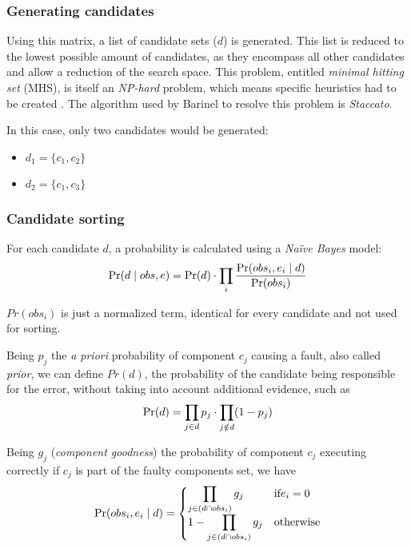 % 
%

\subsubsection{Generating candidates} 

Using this matrix, a list of candidate sets ($d$) is generated. This list is reduced to the lowest possible amount of candidates, as they encompass all other candidates and allow a reduction of the search space. This problem, entitled \emph{minimal hitting set} (MHS), is itself an \emph{NP-hard} problem, which means specific heuristics had to be created \cite{RuiAbreu, Cardoso2013}. The algorithm used by Barinel to resolve this problem is \emph{Staccato}.

In this case, only two candidates would be generated:

\begin{itemize}
\item $d_1 = \{c_1, c_2\}$ 
\item $d_2 = \{c_1, c_3\}$ 
\end{itemize}

% 
%

\subsubsection{Candidate sorting} 

For each candidate $d$, a probability is calculated using a \emph{Naïve Bayes} model:
%
\begin{equation}
  \mbox{Pr}(d\mid obs,e) =  \mbox{Pr}(d) \cdot \prod_{i}\frac{\mbox{Pr}(obs_i, e_i \mid d)}{\mbox{Pr}(obs_i)}
\end{equation}


$Pr(obs_i)$ is just a normalized term, identical for every candidate and not used for sorting.

Being $p_j$ the \emph{a priori} probability of component $c_j$ causing a fault, also called \emph{prior}, we can define $Pr(d)$, the probability of the candidate being responsible for the error, without taking into account additional evidence, such as
%
\begin{equation}
  \mbox{Pr}(d) = \prod_{j \in d} p_j \cdot \prod_{j \notin d} (1 - p_j)
\end{equation}


Being $g_j$ (\emph{component goodness}) the probability of component $c_j$ executing correctly if $c_j$ is part of the faulty components set, we have
% 
\begin{equation}
  \mbox{Pr}(obs_i, e_i \mid  d) = 
  \begin{cases}
    \displaystyle\prod_{j \in (d \cap obs_i)} g_j    & \textrm{if} e_i = 0 \\
  1 - \displaystyle\prod_{j \in (d \cap obs_i)} g_j  & \textrm{otherwise}
  \end{cases}
\end{equation}

